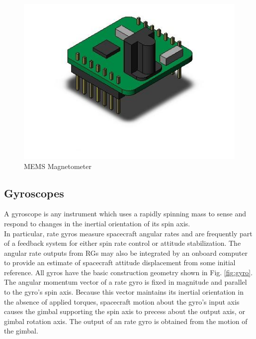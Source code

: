 \documentclass[11pt,a4paper]{report}
\begin{document}
\begin{figure}[H]
 	\centering
 	\includegraphics[scale=1]{gfx/magnetometer.jpg}
    \caption{MEMS Magnetometer}
\end{figure}

\subsection{Gyroscopes}
A gyroscope is any instrument which uses a rapidly spinning mass to sense and respond to changes in the inertial orientation of its spin axis.\\
In particular, rate gyros measure spacecraft angular rates and are frequently part of a feedback system for either spin rate control or attitude stabilization. The angular rate outputs from RGs may also be integrated by an onboard computer to provide an estimate of spacecraft attitude displacement from some initial reference. 
All gyros have the basic construction geometry shown in Fig. \ref{fig:gyro}.\\
The angular momentum vector of a rate gyro is fixed in magnitude and parallel
to the gyro's spin axis. Because this vector maintains its inertial orientation in the absence of applied torques, spacecraft motion about the gyro's input axis causes the gimbal supporting the spin axis to precess about the output axis, or gimbal rotation axis. The output of an rate gyro is obtained from the motion of the gimbal.\\
\end{document}
